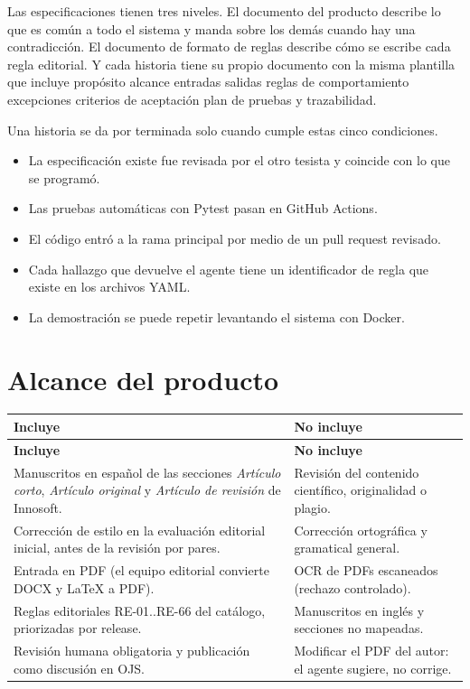 Las especificaciones tienen tres niveles. El documento del producto describe lo que es común a todo el sistema y manda sobre los demás cuando hay una contradicción. El documento de formato de reglas describe cómo se escribe cada regla editorial. Y cada historia tiene su propio documento con la misma plantilla que incluye propósito alcance entradas salidas reglas de comportamiento excepciones criterios de aceptación plan de pruebas y trazabilidad.

Una historia se da por terminada solo cuando cumple estas cinco condiciones.

\begin{itemize}
  \item La especificación existe fue revisada por el otro tesista y coincide con lo que se programó.
  \item Las pruebas automáticas con Pytest pasan en GitHub Actions.
  \item El código entró a la rama principal por medio de un pull request revisado.
  \item Cada hallazgo que devuelve el agente tiene un identificador de regla que existe en los archivos YAML.
  \item La demostración se puede repetir levantando el sistema con Docker.
\end{itemize}

\section{Alcance del producto}

\begin{longtable}{@{}>{\raggedright\arraybackslash}p{}>{\raggedright\arraybackslash}p{}@{}}
\toprule
\textbf{Incluye} & \textbf{No incluye} \\
\midrule
\endfirsthead
\toprule
\textbf{Incluye} & \textbf{No incluye} \\
\midrule
\endhead
\bottomrule
\endfoot
\endlastfoot
Manuscritos en español de las secciones \emph{Artículo corto}, \emph{Artículo original} y \emph{Artículo de revisión} de Innosoft. & Revisión del contenido científico, originalidad o plagio. \\
Corrección de estilo en la evaluación editorial inicial, antes de la revisión por pares. & Corrección ortográfica y gramatical general. \\
Entrada en PDF (el equipo editorial convierte DOCX y LaTeX a PDF). & OCR de PDFs escaneados (rechazo controlado). \\
Reglas editoriales RE-01..RE-66 del catálogo, priorizadas por release. & Manuscritos en inglés y secciones no mapeadas. \\
Revisión humana obligatoria y publicación como discusión en OJS. & Modificar el PDF del autor: el agente sugiere, no corrige. \\
\end{longtable}

